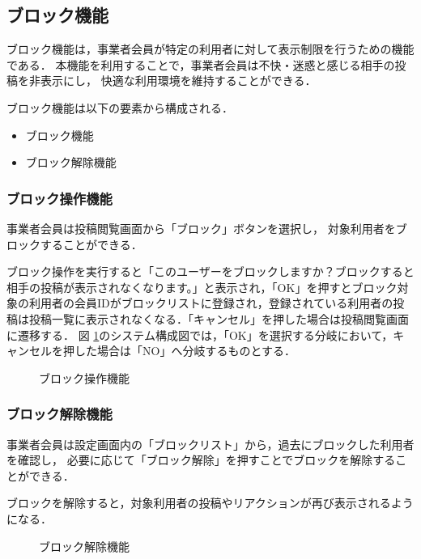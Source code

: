 \subsection{ブロック機能}
ブロック機能は，事業者会員が特定の利用者に対して表示制限を行うための機能である．
本機能を利用することで，事業者会員は不快・迷惑と感じる相手の投稿を非表示にし，
快適な利用環境を維持することができる．

ブロック機能は以下の要素から構成される．

\begin{itemize}
  \item ブロック機能
  \item ブロック解除機能
\end{itemize}

\subsubsection{ブロック操作機能}
事業者会員は投稿閲覧画面から「ブロック」ボタンを選択し，
対象利用者をブロックすることができる．

ブロック操作を実行すると「このユーザーをブロックしますか？ブロックすると相手の投稿が表示されなくなります。」と表示され，「OK」を押すとブロック対象の利用者の会員IDがブロックリストに登録され，登録されている利用者の投稿は投稿一覧に表示されなくなる．「キャンセル」を押した場合は投稿閲覧画面に遷移する．
図 \ref{fig:block1}のシステム構成図では，「OK」を選択する分岐において，キャンセルを押した場合は「NO」へ分岐するものとする．

\begin{figure}[H]
    \centering
    
    \caption{ブロック操作機能}
    \label{fig:block1}
\end{figure}

\subsubsection{ブロック解除機能}
事業者会員は設定画面内の「ブロックリスト」から，過去にブロックした利用者を確認し，
必要に応じて「ブロック解除」を押すことでブロックを解除することができる．

ブロックを解除すると，対象利用者の投稿やリアクションが再び表示されるようになる．

\begin{figure}[H]
    \centering
    
    \caption{ブロック解除機能}
    \label{fig:block3}
\end{figure}
